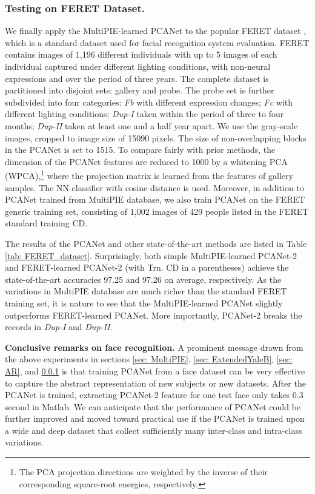 \documentclass[10pt,journal,compsoc]{IEEEtran}
\begin{document}
\subsubsection{Testing on FERET Dataset.}\label{sec: FERET}
We finally apply the MultiPIE-learned PCANet to the popular FERET dataset \cite{Jonathon1998}, which is a standard dataset used for facial recognition system evaluation. FERET contains images of 1,196 different individuals with up to 5 images of each individual captured under different lighting conditions, with non-neural expressions and over the period of three years. The complete dataset is partitioned into disjoint sets: gallery and probe. The probe set is further subdivided into four categories: {\it Fb} with different expression changes; {\it Fc} with different lighting conditions; {\it Dup-I} taken within the period of three to four months; {\it Dup-II} taken at least one and a half year apart. We use the gray-scale images, cropped to image size of 15090 pixels. The size of non-overlapping blocks in the PCANet is set to {1515}. To compare fairly with prior methods, the dimension of the PCANet features are reduced to 1000 by a whitening PCA (WPCA),\footnote{The PCA projection directions are weighted by the inverse of their corresponding square-root energies, respectively.} where the projection matrix is learned from the features of gallery samples. The NN classifier with cosine distance is used. Moreover, in addition to PCANet trained from MultiPIE database, we also train PCANet on the FERET generic training set, consisting of 1,002 images of 429 people listed in the FERET standard training CD.

{
The results of the PCANet and other state-of-the-art methods are listed in Table \ref{tab: FERET_dataset}. Surprisingly, both simple MultiPIE-learned PCANet-2 and FERET-learned PCANet-2 (with Trn. CD in a parentheses) achieve the state-of-the-art accuracies 97.25 and 97.26 on average, respectively. As the variations in MultiPIE database are much richer than the standard FERET training set, it is nature to see that the MultiPIE-learned PCANet slightly outperforms FERET-learned PCANet. More importantly, PCANet-2 breaks the records in {\it Dup-I} and {\it Dup-II}.
}

{\bf Conclusive remarks on face recognition.} A prominent message drawn from the above experiments in sections \ref{sec: MultiPIE}, \ref{sec: ExtendedYaleB}, \ref{sec: AR}, and \ref{sec: FERET} is that training PCANet from a face dataset can be very effective to capture the abstract representation of new subjects or new datasets. After the PCANet is trained, extracting PCANet-2 feature for one test face only takes 0.3 second in Matlab. We can anticipate that the performance of PCANet could be further improved and moved toward practical use if the PCANet is trained upon a wide and deep dataset that collect sufficiently many inter-class and intra-class variations.
\end{document}
